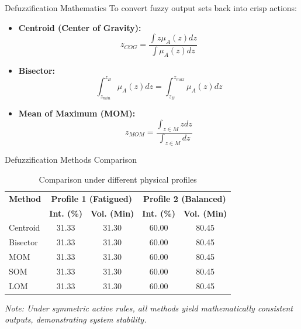 \documentclass[11pt]{beamer}
\begin{document}
\begin{frame}{Defuzzification Mathematics}
  To convert fuzzy output sets back into crisp actions:
  \begin{itemize}
      \item \textbf{Centroid (Center of Gravity):}
      \begin{equation*}
      z_{COG} = \frac{\int z \mu_A(z) dz}{\int \mu_A(z) dz}
      \end{equation*}
      \item \textbf{Bisector:}
      \begin{equation*}
      \int_{z_{min}}^{z_B} \mu_A(z) dz = \int_{z_B}^{z_{max}} \mu_A(z) dz
      \end{equation*}
      \item \textbf{Mean of Maximum (MOM):}
      \begin{equation*}
      z_{MOM} = \frac{\int_{z \in M} z dz}{\int_{z \in M} dz}
      \end{equation*}
  \end{itemize}
\end{frame}

\begin{frame}{Defuzzification Methods Comparison}
  \begin{table}[htbp]
  \centering
  \footnotesize
  \caption{Comparison under different physical profiles}
  \begin{tabular}{lcccc}
  \toprule
  \textbf{Method} & \multicolumn{2}{c}{\textbf{Profile 1 (Fatigued)}} & \multicolumn{2}{c}{\textbf{Profile 2 (Balanced)}} \\
   & \textbf{Int. (\%)} & \textbf{Vol. (Min)} & \textbf{Int. (\%)} & \textbf{Vol. (Min)} \\
  \midrule
  Centroid & 31.33 & 31.30 & 60.00 & 80.45 \\
  Bisector & 31.33 & 31.30 & 60.00 & 80.45 \\
  MOM      & 31.33 & 31.30 & 60.00 & 80.45 \\
  SOM      & 31.33 & 31.30 & 60.00 & 80.45 \\
  LOM      & 31.33 & 31.30 & 60.00 & 80.45 \\
  \bottomrule
  \end{tabular}
  \end{table}
  \textit{Note: Under symmetric active rules, all methods yield mathematically consistent outputs, demonstrating system stability.}
\end{frame}
\end{document}
